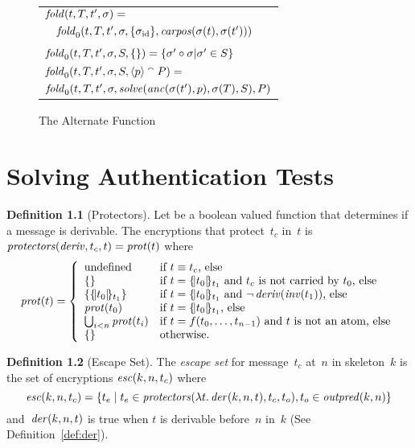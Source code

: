 \documentclass[12pt]{report}
\theoremstyle{definition}
\newtheorem{defn}{Definition}[chapter]
\newcommand{\outpred}{\fn{outpred}}
\begin{document}
\begin{figure}
\begin{center}
\begin{tabular}{l}
$\operatorname{\mathit{fold}}(t,T,t',\sigma)={}$\\
$\quad\operatorname{\mathit{fold}}_0(t,T,t',\sigma,\{\sigma_{\mathrm{id}}\},\operatorname{\mathit{carpos}}(\sigma(t), \sigma(t')))$\\
\\
$\operatorname{\mathit{fold}}_0(t,T,t',\sigma,S,\{\})=\{\sigma' \circ \sigma | \sigma' \in S\}$\\
$\operatorname{\mathit{fold}}_0(t,T,t',\sigma,S,\langle p\rangle \mathbin{{}^\smallfrown} P)={}$\\
\quad
$\operatorname{\mathit{fold}}_0(t,T,t',\sigma,\operatorname{\mathit{solve}}(\operatorname{\mathit{anc}}(\sigma(t'),p),\sigma(T),S),P)$\\
\end{tabular}
\end{center}
\caption{The Alternate  Function}\label{fig:fold}
\end{figure}

\chapter{Solving Authentication Tests}\label{chp:auth tests}

\begin{defn}[Protectors]
Let  be a boolean valued function that determines if a
message is derivable.  The encryptions that
protect~$t_c$ in~$t$ is
$\operatorname{\mathit{protectors}}(\operatorname{\mathit{deriv}},t_c, t) = \operatorname{\mathit{prot}}(t)$ where
$$\fn{prot}(t) =\left\{
\begin{array}{ll}
\mbox{undefined}&\mbox{if $t\equiv t_c$, else}\\
\{\}&\mbox{if $t=\enc{t_0}{t_1}$ and $t_c$ is not carried by~$t_0$, else}\\
\{\enc{t_0}{t_1}\}&
\mbox{if $t=\enc{t_0}{t_1}$ and $\lnot\fn{deriv}(\fn{inv}(t_1))$, else}\\
\fn{prot}(t_0)&\mbox{if $t=\enc{t_0}{t_1}$, else}\\
\bigcup_{i<n}\fn{prot}(t_i)&\mbox{if $t=f(t_0,\ldots,t_{n-1})$ and~$t$
  is not an atom, else}\\
\{\}&\mbox{otherwise.}
\end{array}\right.$$
\end{defn}

\begin{defn}[Escape Set]
The \emph{escape set} for message~$t_c$ at~$n$ in
skeleton~$k$ is the set of encryptions $\operatorname{\mathit{esc}}(k,n,t_c)$ where
$$\fn{esc}(k,n,t_c)=\{t_e\mid t_e\in\fn{protectors}(\lambda
t\mathpunct.\fn{der}(k,n,t),t_c,t_o), t_o\in\outpred(k,n)\}$$
and~$\operatorname{\mathit{der}}(k,n,t)$ is true when $t$ is derivable before~$n$ in~$k$
(See Definition~\ref{def:der}).
\end{defn}
\end{document}
